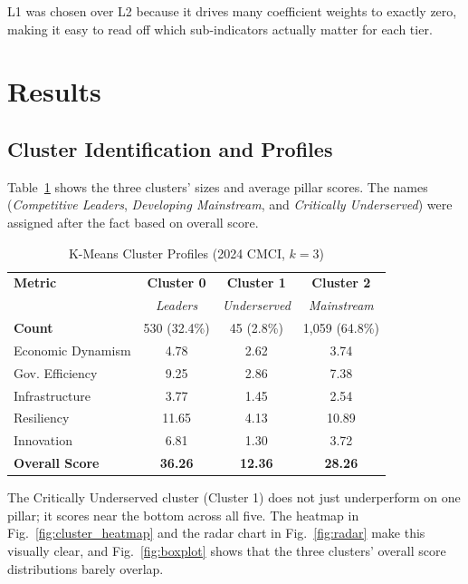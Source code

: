 \documentclass[conference]{IEEEtran}
\begin{document}
L1 was chosen over L2 because it drives many coefficient weights to exactly zero, making it easy to read off which sub-indicators actually matter for each tier.

\section{Results}
\label{sec:results}

\subsection{Cluster Identification and Profiles}

Table~\ref{tab:cluster_summary} shows the three clusters' sizes and average pillar scores. The names (\textit{Competitive Leaders}, \textit{Developing Mainstream}, and \textit{Critically Underserved}) were assigned after the fact based on overall score.

\begin{table}[htbp]
\caption{K-Means Cluster Profiles (2024 CMCI, $k=3$)}
\label{tab:cluster_summary}
\centering
\begin{tabular}{lccc}
\toprule
\textbf{Metric} & \textbf{Cluster 0} & \textbf{Cluster 1} & \textbf{Cluster 2} \\
 & \textit{Leaders} & \textit{Underserved} & \textit{Mainstream} \\
\midrule
\textbf{Count} & 530 (32.4\%) & 45 (2.8\%) & 1,059 (64.8\%) \\
\midrule
Economic Dynamism & 4.78 & 2.62 & 3.74 \\
Gov. Efficiency & 9.25 & 2.86 & 7.38 \\
Infrastructure & 3.77 & 1.45 & 2.54 \\
Resiliency & 11.65 & 4.13 & 10.89 \\
Innovation & 6.81 & 1.30 & 3.72 \\
\midrule
\textbf{Overall Score} & \textbf{36.26} & \textbf{12.36} & \textbf{28.26} \\
\bottomrule
\end{tabular}
\end{table}

The Critically Underserved cluster (Cluster 1) does not just underperform on one pillar; it scores near the bottom across all five. The heatmap in Fig.~\ref{fig:cluster_heatmap} and the radar chart in Fig.~\ref{fig:radar} make this visually clear, and Fig.~\ref{fig:boxplot} shows that the three clusters' overall score distributions barely overlap.
\end{document}
